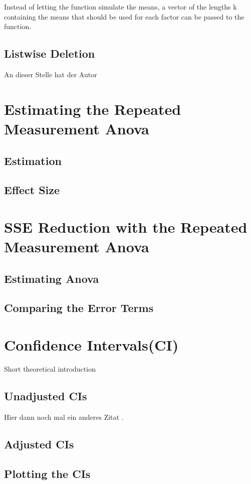 \documentclass[11pt]{article}
\begin{document}
				 Instead of letting the function simulate the means, a vector of the lengths k containing the means that should be used for each factor can be passed to the function.   
				 
		\subsection{Listwise Deletion}
				 An dieser Stelle hat der Autor
				 
	\section{Estimating the Repeated Measurement Anova}
		\subsection{Estimation}
	
		\subsection{Effect Size}
	
	\section{SSE Reduction with the Repeated Measurement Anova}
		\subsection{Estimating Anova}
	
		\subsection{Comparing the Error Terms}
		
 
	\section{Confidence Intervals(CI)}
	Short theoretical introduction
		\subsection{Unadjusted CIs}
		Hier dann noch mal ein anderes Zitat \citep{003}.
		\subsection{Adjusted CIs}
		
		\subsection{Plotting the CIs}
		
\end{document}

